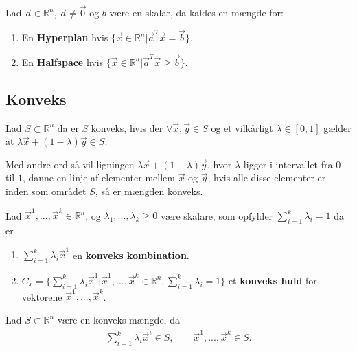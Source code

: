 \begin{defn}
Lad $ \vec{a} \in \mathds{R}^n$, $\vec{a}\neq \vec{0}$ og $b$ være en skalar, da kaldes en mængde for:
\begin{enumerate}
\item En \textbf{Hyperplan} hvis $\{ \vec{x} \in \mathds{R}^n | \vec{a}^{T}\vec{x} = \vec{b}\}$,
\\ \item En \textbf{Halfspace} hvis $\{ \vec{x} \in \mathds{R}^n | \vec{a}^{T} \vec{x} \geq \vec{b}\}$.
\end{enumerate}
\end{defn}

\subsection{Konveks}

\begin{defn} [Konveks]
Lad $S \subset \mathds{R}^n$  da er $S$ konveks, hvis der $\forall \vec{x}, \vec{y} \in S$ og et vilkårligt $\lambda \in [0,1]$ gælder at $\lambda \vec{x} + (1-\lambda) \vec{y} \in S$.
\label{def:Konveks}
\end{defn}
Med andre ord så vil ligningen $\lambda \vec{x} + (1-\lambda) \vec{y}$, hvor $\lambda$ ligger i intervallet fra $0$ til $1$, danne en linje af elementer mellem $\vec{x}$ og $\vec{y}$, hvis alle disse elementer er inden som området $S$, så er mængden konveks.

\begin{defn}
Lad $\vec{x}^1, ...,\vec{x}^k \in \mathds{R}^n$, og $\lambda_1,..., \lambda_k \geq 0 $ være skalare, som opfylder $\sum_{i=1}^k \lambda_i =1$ da er
\begin{enumerate}[label=(\alph*)]
\item $\sum_{i=1}^k \lambda_i \vec{x}^1$ en \textbf{konveks kombination}.
\\ \item $C_{x} = \{\sum_{i=1}^k \lambda_i \vec{x}^1| \vec{x}^1, ...,\vec{x}^k \in \mathds{R}^n, \sum_{i=1}^k \lambda_i =1\}$ et \textbf{konveks huld} for vektorene $\vec{x}^1, ...,\vec{x}^k$. 
\end{enumerate}
\label{def:KonveksKombination}
\end{defn}

\begin{stn}
Lad $S\subset \mathds{R}^n$ være en konveks mængde, da
\begin{align*}
	\sum_{i=1}^k \lambda_i \vec{x}^i \in S, \qquad \vec{x}^1, ...,\vec{x}^k \in S.
\end{align*}
\label{stn:KonveksKombination}
\end{stn}

